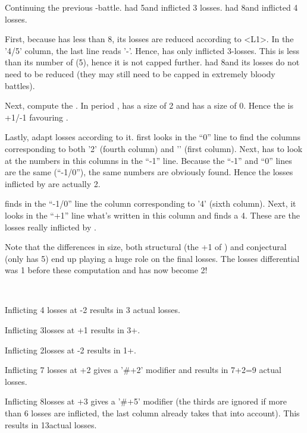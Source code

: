 \begin{exemple}
  Continuing the previous \FRA-\HIS battle. \HIS had 5\LD and inflicted 3
  losses. \FRA had 8\LD and inflicted 4 losses.

  First, because \HIS has less than 8\LD, its losses are reduced according to
  <L1>. In the '4/5\LD' column, the last line reads '-\texttd'. Hence, \HIS
  has only inflicted 3-\texttu losses. This is less than its number
  of \LD (5), hence it is not capped further. \FRA had 8\LD and its losses do
  not need to be reduced (they may still need to be capped in extremely bloody
  battles).

  Next, compute the . In period , \FRA
  has a size of 2 and \HIS has a size of 0. Hence the  is +1/-1 favouring \FRA.

  Lastly, adapt losses according to it. \HIS first looks in the ``0'' line to
  find the columns corresponding to both '2' (fourth column) and '\texttu'
  (first column). Next, \HIS has to look at the numbers in this columns in the
  ``-1'' line. Because the ``-1'' and ``0'' lines are the same (``-1/0''), the
  same numbers are obviously found. Hence the losses inflicted by \HIS are
  actually 2\texttu.

  \FRA finds in the ``-1/0'' line the column corresponding to '4' (sixth
  column). Next, it looks in the ``+1'' line what's written in this column and
  finds a 4\texttd. These are the losses really inflicted by \FRA.

  Note that the differences in size, both structural (the +1 of \FRA) and
  conjectural (\HIS only has 5\LD) end up playing a huge role on the final
  losses. The losses differential was 1 before these computation and has now
  become 2\texttu!
\end{exemple}

\begin{exemple}~

  Inflicting 4 losses at -2 results in 3 actual losses.

  Inflicting 3\texttd losses at +1 results in 3\texttd+\texttu.

  Inflicting 2\texttd losses at -2 results in 1\texttu+\texttd.

  Inflicting 7 losses at +2 gives a '\#+2' modifier and results in 7+2=9
  actual losses.

  Inflicting 8\texttu losses at +3 gives a '\#+5' modifier (the thirds are
  ignored if more than 6 losses are inflicted, the last column already takes
  that into account). This results in 13\texttu actual losses.
\end{exemple}

